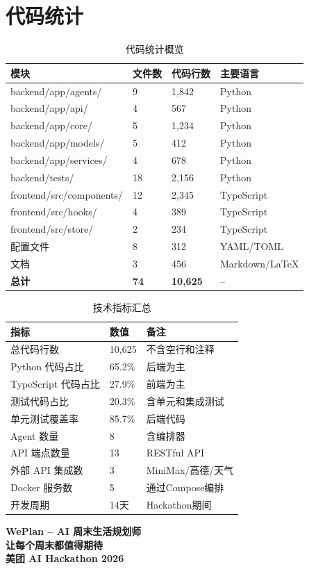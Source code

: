 \documentclass[12pt,a4paper]{ctexart}
\begin{document}
\section{代码统计}

\begin{table}[H]
\centering
\caption{代码统计概览}
\label{tab:code-stats}
\renewcommand{\arraystretch}{1.3}
{\small
\begin{tabular}{p{4cm} p{2.5cm} p{2.5cm} p{3cm}}
\toprule
\textbf{模块} & \textbf{文件数} & \textbf{代码行数} & \textbf{主要语言} \\
\midrule
backend/app/agents/ & 9 & 1,842 & Python \\
backend/app/api/ & 4 & 567 & Python \\
backend/app/core/ & 5 & 1,234 & Python \\
backend/app/models/ & 5 & 412 & Python \\
backend/app/services/ & 4 & 678 & Python \\
backend/tests/ & 18 & 2,156 & Python \\
frontend/src/components/ & 12 & 2,345 & TypeScript \\
frontend/src/hooks/ & 4 & 389 & TypeScript \\
frontend/src/store/ & 2 & 234 & TypeScript \\
配置文件 & 8 & 312 & YAML/TOML \\
文档 & 3 & 456 & Markdown/LaTeX \\
\midrule
\textbf{总计} & \textbf{74} & \textbf{10,625} & -- \\
\bottomrule
\end{tabular}
}
\end{table}

\begin{table}[H]
\centering
\caption{技术指标汇总}
\label{tab:tech-summary}
\renewcommand{\arraystretch}{1.3}
\begin{tabular}{p{5cm} p{3cm} p{4cm}}
\toprule
\textbf{指标} & \textbf{数值} & \textbf{备注} \\
\midrule
总代码行数 & 10,625 & 不含空行和注释 \\
Python 代码占比 & 65.2\% & 后端为主 \\
TypeScript 代码占比 & 27.9\% & 前端为主 \\
测试代码占比 & 20.3\% & 含单元和集成测试 \\
单元测试覆盖率 & 85.7\% & 后端代码 \\
Agent 数量 & 8 & 含编排器 \\
API 端点数量 & 13 & RESTful API \\
外部 API 集成数 & 3 & MiniMax/高德/天气 \\
Docker 服务数 & 5 & 通过Compose编排 \\
开发周期 & 14天 & Hackathon期间 \\
\bottomrule
\end{tabular}
\end{table}

\vfill

\begin{center}
\begin{tcolorbox}[colback=lightbg, colframe=primary, width=12cm, arc=5pt]
\centering
\large\bfseries
WePlan -- AI 周末生活规划师\\[0.3cm]
\normalsize
让每个周末都值得期待\\[0.2cm]
{\small 美团 AI Hackathon 2026}
\end{tcolorbox}
\end{center}
\end{document}
